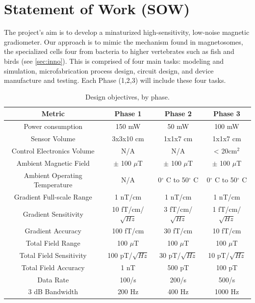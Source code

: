 

\section{Statement of Work (SOW)}
The project's aim is to develop a minaturized high-sensitivity, low-noise magnetic gradiometer. Our approach is to mimic the mechanism found in magnetosomes, the specialized cells four from bacteria to higher vertebrates such as fish and birds (see \ref{sec:inno}). This is comprised of four main tasks: modeling and simulation, microfabrication process design, circuit design, and device manufacture and testing. Each Phase (1,2,3) will include these four tasks.
\begin{table}[h!]
\centering
  \begin{tabular}{|c||c|c|c|}
    \hline
    Metric & Phase 1 & Phase 2 & Phase 3 \\
    \hline
    \hline
    Power consumption & 150 mW & 50 mW & 100 mW \\
    \hline
    Sensor Volume & 3x3x10 cm & 1x1x7 cm & 1x1x7 cm \\
    \hline
    Control Electronics Volume  & N/A & N/A & < 20cm$^2$ \\
    \hline
    Ambient Magnetic Field & $\pm$ 100 $\mu$T & $\pm$ 100 $\mu$T & $\pm$ 100 $\mu$T \\
    \hline
    Ambient Operating Temperature & N/A & 0$^{\circ}$ C to 50$^{\circ}$ C & 0$^{\circ}$ C to 50$^{\circ}$ C \\
    \hline
    Gradient Full-scale Range & 1 nT/cm & 1 nT/cm & 1 nT/cm \\
    \hline
    Gradient Sensitivity & 10 fT/cm/$\sqrt{Hz}$ & 3 fT/cm/$\sqrt{Hz}$  & 1 fT/cm/$\sqrt{Hz}$ \\
    \hline
    Gradient Accuracy & 100 fT/cm & 30 fT/cm & 10 fT/cm \\
    \hline
    Total Field Range & 100 $\mu$T & 100 $\mu$T & 100 $\mu$T \\
    \hline
    Total Field Sensitivity & 100 pT/$\sqrt{Hz}$ & 30 pT/$\sqrt{Hz}$  &  10 pT/$\sqrt{Hz}$ \\
    \hline
    Total Field Accuracy & 1 nT & 500 pT & 100 pT \\
    \hline
    Data Rate & 100/s & 200/s & 500/s \\
    \hline
    3 dB Bandwidth & 200 Hz & 400 Hz & 1000 Hz\\
    \hline
  \end{tabular}
\caption{Design objectives, by phase.}
\label{table:obj}
\end{table}

